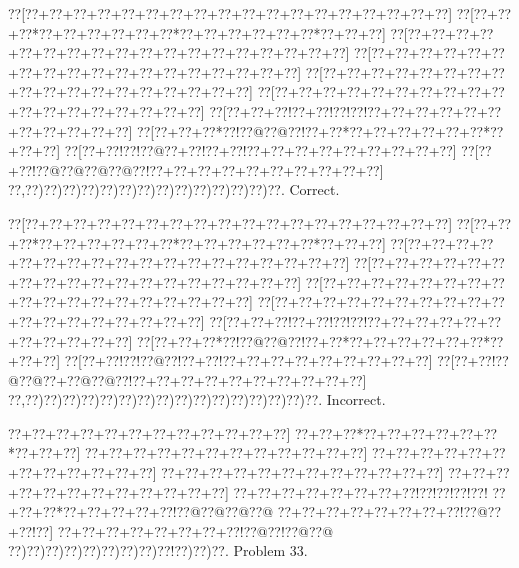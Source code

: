 \documentclass[a5paper]{article}
\begin{document}
\begin{center}
{\goo
\0??[\0??+\0??+\0??+\0??+\0??+\0??+\0??+\0??+\0??+\0??+\0??+\0??+\0??+\0??+\0??+\0??+\0??+\0??]
\0??[\0??+\0??+\0??*\0??+\0??+\0??+\0??+\0??+\0??*\0??+\0??+\0??+\0??+\0??+\0??*\0??+\0??+\0??]
\0??[\0??+\0??+\0??+\0??+\0??+\0??+\0??+\0??+\0??+\0??+\0??+\0??+\0??+\0??+\0??+\0??+\0??+\0??]
\0??[\0??+\0??+\0??+\0??+\0??+\0??+\0??+\0??+\0??+\0??+\0??+\0??+\0??+\0??+\0??+\0??+\0??+\0??]
\0??[\0??+\0??+\0??+\0??+\0??+\0??+\0??+\0??+\0??+\0??+\0??+\0??+\0??+\0??+\0??+\0??+\0??+\0??]
\0??[\0??+\0??+\0??+\0??+\0??+\0??+\0??+\0??+\0??+\0??+\0??+\0??+\0??+\0??+\0??+\0??+\0??+\0??]
\0??[\0??+\0??+\0??!\0??+\0??!\0??!\0??!\0??+\0??+\0??+\0??+\0??+\0??+\0??+\0??+\0??+\0??+\0??]
\0??[\0??+\0??+\0??*\0??!\0??@\0??@\0??!\0??+\0??*\0??+\0??+\0??+\0??+\0??+\0??*\0??+\0??+\0??]
\0??[\0??+\0??!\0??!\0??@\0??+\0??!\0??+\0??!\0??+\0??+\0??+\0??+\0??+\0??+\0??+\0??+\0??]
\0??[\0??+\0??!\0??@\0??@\0??@\0??@\0??!\0??+\0??+\0??+\0??+\0??+\0??+\0??+\0??+\0??+\0??]
\0??,\0??)\0??)\0??)\0??)\0??)\0??)\0??)\0??)\0??)\0??)\0??)\0??)\0??)\0??.
}
Correct. 

\end{center}
\begin{center}
{\goo
\0??[\0??+\0??+\0??+\0??+\0??+\0??+\0??+\0??+\0??+\0??+\0??+\0??+\0??+\0??+\0??+\0??+\0??+\0??]
\0??[\0??+\0??+\0??*\0??+\0??+\0??+\0??+\0??+\0??*\0??+\0??+\0??+\0??+\0??+\0??*\0??+\0??+\0??]
\0??[\0??+\0??+\0??+\0??+\0??+\0??+\0??+\0??+\0??+\0??+\0??+\0??+\0??+\0??+\0??+\0??+\0??+\0??]
\0??[\0??+\0??+\0??+\0??+\0??+\0??+\0??+\0??+\0??+\0??+\0??+\0??+\0??+\0??+\0??+\0??+\0??+\0??]
\0??[\0??+\0??+\0??+\0??+\0??+\0??+\0??+\0??+\0??+\0??+\0??+\0??+\0??+\0??+\0??+\0??+\0??+\0??]
\0??[\0??+\0??+\0??+\0??+\0??+\0??+\0??+\0??+\0??+\0??+\0??+\0??+\0??+\0??+\0??+\0??+\0??+\0??]
\0??[\0??+\0??+\0??!\0??+\0??!\0??!\0??!\0??+\0??+\0??+\0??+\0??+\0??+\0??+\0??+\0??+\0??+\0??]
\0??[\0??+\0??+\0??*\0??!\0??@\0??@\0??!\0??+\0??*\0??+\0??+\0??+\0??+\0??+\0??*\0??+\0??+\0??]
\0??[\0??+\0??!\0??!\0??@\0??!\0??+\0??!\0??+\0??+\0??+\0??+\0??+\0??+\0??+\0??+\0??]
\0??[\0??+\0??!\0??@\0??@\0??+\0??@\0??@\0??!\0??+\0??+\0??+\0??+\0??+\0??+\0??+\0??+\0??+\0??]
\0??,\0??)\0??)\0??)\0??)\0??)\0??)\0??)\0??)\0??)\0??)\0??)\0??)\0??)\0??)\0??)\0??.
}
Incorrect. 

\end{center}
\newpage
\begin{center}
{\goo
\0??+\0??+\0??+\0??+\0??+\0??+\0??+\0??+\0??+\0??+\0??+\0??]
\0??+\0??+\0??*\0??+\0??+\0??+\0??+\0??+\0??*\0??+\0??+\0??]
\0??+\0??+\0??+\0??+\0??+\0??+\0??+\0??+\0??+\0??+\0??+\0??]
\0??+\0??+\0??+\0??+\0??+\0??+\0??+\0??+\0??+\0??+\0??+\0??]
\0??+\0??+\0??+\0??+\0??+\0??+\0??+\0??+\0??+\0??+\0??+\0??]
\0??+\0??+\0??+\0??+\0??+\0??+\0??+\0??+\0??+\0??+\0??+\0??]
\0??+\0??+\0??+\0??+\0??+\0??+\0??+\0??!\0??!\0??!\0??!\0??!
\0??+\0??+\0??*\0??+\0??+\0??+\0??+\0??!\0??@\0??@\0??@\0??@
\0??+\0??+\0??+\0??+\0??+\0??+\0??+\0??!\0??@\0??+\0??!\0??]
\0??+\0??+\0??+\0??+\0??+\0??+\0??+\0??!\0??@\0??!\0??@\0??@
\0??)\0??)\0??)\0??)\0??)\0??)\0??)\0??)\0??!\0??)\0??)\0??.
}
Problem 33.

\end{center}
\end{document}
